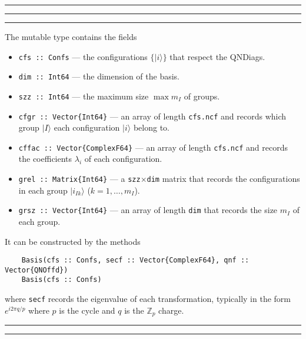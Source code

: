 \documentclass{timesjhep}
\newenvironment{block}[1]{\vspace{0.4\baselineskip}\hrule\vspace{0.10\baselineskip}\hrule\vspace{0.30\baselineskip}{\bfseries #1}\vspace{0.2\baselineskip}\hrule\vspace{0.3\baselineskip}
}{\vspace{0.2\baselineskip}\hrule\vspace{0.10\baselineskip}\hrule\vspace{0.5\baselineskip}}
\begin{document}
\begin{block}{\lstinline|Basis| --- Type}
The mutable type contains the fields
\begin{itemize}
    \item \lstinline|cfs :: Confs| --- the configurations $\{|i\rangle\}$ that respect the QNDiags.
    \item \lstinline|dim :: Int64| --- the dimension of the basis.
    \item \lstinline|szz :: Int64| --- the maximum size $\max m_I$ of groups.
    \item \lstinline|cfgr :: Vector{Int64}| --- an array of length \lstinline|cfs.ncf| and records which group $|I\rangle$ each configuration $|i\rangle$ belong to.
    \item \lstinline|cffac :: Vector{ComplexF64}| --- an array of length \lstinline|cfs.ncf| and records the coefficients $\lambda_i$ of each configuration.
    \item \lstinline|grel :: Matrix{Int64}| --- a \lstinline|szz|$\times$\lstinline|dim| matrix that records the configurations in each group $|i_{Ik}\rangle$ ($k=1,\dots,m_I$).
    \item \lstinline|grsz :: Vector{Int64}| --- an array of length \lstinline|dim| that records the size $m_I$ of each group.
\end{itemize}
It can be constructed by the methods 
\begin{lstlisting}
    Basis(cfs :: Confs, secf :: Vector{ComplexF64}, qnf :: Vector{QNOffd})
    Basis(cfs :: Confs)
\end{lstlisting}
where \lstinline|secf| records the eigenvalue of each transformation, typically in the form $e^{i2\pi q/p}$ where $p$ is the cycle and $q$ is the $\mathbb{Z}_p$ charge. 
\end{block}
\end{document}

